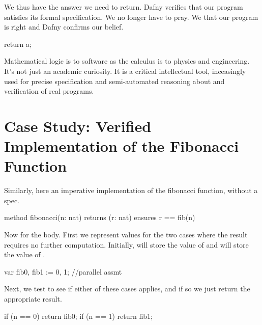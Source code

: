 \documentclass[letterpaper,10pt,english]{sphinxmanual}
\begin{document}
We thus have the answer we need to return.  Dafny verifies that our
program satisfies its formal specification. We no longer have to
pray. We  that our program is right and Dafny confirms our
belief.

\begin{sphinxVerbatim}[commandchars=\\\{\}]
return a;
\end{sphinxVerbatim}

Mathematical logic is to software as the calculus is to physics and
engineering.  It’s not just an academic curiosity. It is a critical
intellectual tool, inceasingly used for precise specification and
semi-automated reasoning about and verification of real programs.


\section{Case Study: Verified Implementation of the Fibonacci Function}
\label{\detokenize{05-putting-it-together:case-study-verified-implementation-of-the-fibonacci-function}}
Similarly, here an imperative implementation of the fibonacci
function, without a spec.

\begin{sphinxVerbatim}[commandchars=\\\{\}]
method fibonacci(n: nat) returns (r: nat)
    ensures r == fib(n)
\end{sphinxVerbatim}

Now for the body. First we represent values for the two
cases where the result requires no further computation.
Initially,  will store the value of  and
 will store the value of .

\begin{sphinxVerbatim}[commandchars=\\\{\}]
var fib0, fib1 := 0, 1; //parallel assmt
\end{sphinxVerbatim}

Next, we test to see if either of these cases applies,
and if so we just return the appropriate result.

\begin{sphinxVerbatim}[commandchars=\\\{\}]
if (n == 0) \PYGZob{} return fib0; \PYGZcb{}
if (n == 1) \PYGZob{} return fib1; \PYGZcb{}
\end{sphinxVerbatim}
\end{document}
